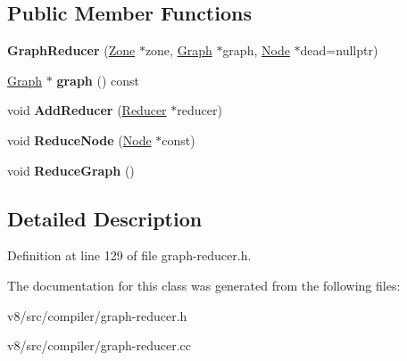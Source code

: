 \subsection*{Public Member Functions}
\begin{DoxyCompactItemize}
\item 
\mbox{\label{classv8_1_1internal_1_1compiler_1_1GraphReducer_a234dce17c72dd0eef3e84754e0c78fbd}} 
{\bfseries Graph\+Reducer} (\mbox{\hyperlink{classv8_1_1internal_1_1Zone}{Zone}} $\ast$zone, \mbox{\hyperlink{classv8_1_1internal_1_1compiler_1_1Graph}{Graph}} $\ast$graph, \mbox{\hyperlink{classv8_1_1internal_1_1compiler_1_1Node}{Node}} $\ast$dead=nullptr)
\item 
\mbox{\label{classv8_1_1internal_1_1compiler_1_1GraphReducer_a8e0487d58e8ec49ab07d140636a4fd90}} 
\mbox{\hyperlink{classv8_1_1internal_1_1compiler_1_1Graph}{Graph}} $\ast$ {\bfseries graph} () const
\item 
\mbox{\label{classv8_1_1internal_1_1compiler_1_1GraphReducer_a329d6fb23dd54f07625fce43008c2241}} 
void {\bfseries Add\+Reducer} (\mbox{\hyperlink{classv8_1_1internal_1_1compiler_1_1Reducer}{Reducer}} $\ast$reducer)
\item 
\mbox{\label{classv8_1_1internal_1_1compiler_1_1GraphReducer_a29a312f60ff837b899dd53414bd69753}} 
void {\bfseries Reduce\+Node} (\mbox{\hyperlink{classv8_1_1internal_1_1compiler_1_1Node}{Node}} $\ast$const)
\item 
\mbox{\label{classv8_1_1internal_1_1compiler_1_1GraphReducer_a5bbd1eaf3d27ed84b49d1b43e3e31958}} 
void {\bfseries Reduce\+Graph} ()
\end{DoxyCompactItemize}


\subsection{Detailed Description}


Definition at line 129 of file graph-\/reducer.\+h.



The documentation for this class was generated from the following files\+:\begin{DoxyCompactItemize}
\item 
v8/src/compiler/graph-\/reducer.\+h\item 
v8/src/compiler/graph-\/reducer.\+cc\end{DoxyCompactItemize}
